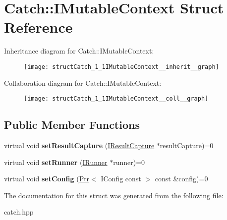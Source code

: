 \hypertarget{structCatch_1_1IMutableContext}{}\section{Catch\+:\+:I\+Mutable\+Context Struct Reference}
\label{structCatch_1_1IMutableContext}


Inheritance diagram for Catch\+:\+:I\+Mutable\+Context\+:
\nopagebreak
\begin{figure}[H]
\begin{center}
\leavevmode
\texttt{[image: structCatch\_1\_1IMutableContext\_\_inherit\_\_graph]}
\end{center}
\end{figure}


Collaboration diagram for Catch\+:\+:I\+Mutable\+Context\+:
\nopagebreak
\begin{figure}[H]
\begin{center}
\leavevmode
\texttt{[image: structCatch\_1\_1IMutableContext\_\_coll\_\_graph]}
\end{center}
\end{figure}
\subsection*{Public Member Functions}
\begin{DoxyCompactItemize}
\item 
\mbox{\label{structCatch_1_1IMutableContext_a4a80afd0525b7def21bee8d9b48f2d39}} 
virtual void {\bfseries set\+Result\+Capture} (\hyperlink{structCatch_1_1IResultCapture}{I\+Result\+Capture} $\ast$result\+Capture)=0
\item 
\mbox{\label{structCatch_1_1IMutableContext_af2e53b1dea4527a2587cff266a730f6e}} 
virtual void {\bfseries set\+Runner} (\hyperlink{structCatch_1_1IRunner}{I\+Runner} $\ast$runner)=0
\item 
\mbox{\label{structCatch_1_1IMutableContext_a013e8f688a8ea7970262d07ead542a63}} 
virtual void {\bfseries set\+Config} (\hyperlink{classCatch_1_1Ptr}{Ptr}$<$ I\+Config const $>$ const \&config)=0
\end{DoxyCompactItemize}


The documentation for this struct was generated from the following file\+:\begin{DoxyCompactItemize}
\item 
catch.\+hpp\end{DoxyCompactItemize}
